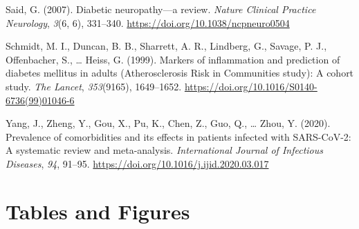 \documentclass[
  man]{apa6}
\newlength{\cslhangindent}
\newlength{\cslentryspacingunit} %
\newenvironment{CSLReferences}[2] %
 {%
  \setlength{\parindent}{0pt}
  \ifodd #1
  \let\oldpar\par
  \def\par{\hangindent=\cslhangindent\oldpar}
  \fi
  \setlength{\parskip}{#2\cslentryspacingunit}
 }%
 {}
\begin{document}
\begin{CSLReferences}{1}{0}
\leavevmode{}%
Said, G. (2007). Diabetic neuropathy---a review. \emph{Nature Clinical Practice Neurology}, \emph{3}(6, 6), 331--340. \url{https://doi.org/10.1038/ncpneuro0504}

\leavevmode{}%
Schmidt, M. I., Duncan, B. B., Sharrett, A. R., Lindberg, G., Savage, P. J., Offenbacher, S., \ldots{} Heiss, G. (1999). Markers of inflammation and prediction of diabetes mellitus in adults ({Atherosclerosis Risk} in {Communities} study): A cohort study. \emph{The Lancet}, \emph{353}(9165), 1649--1652. \url{https://doi.org/10.1016/S0140-6736(99)01046-6}

\leavevmode{}%
Yang, J., Zheng, Y., Gou, X., Pu, K., Chen, Z., Guo, Q., \ldots{} Zhou, Y. (2020). Prevalence of comorbidities and its effects in patients infected with {SARS-CoV-2}: A systematic review and meta-analysis. \emph{International Journal of Infectious Diseases}, \emph{94}, 91--95. \url{https://doi.org/10.1016/j.ijid.2020.03.017}

\end{CSLReferences}

\newpage

\hypertarget{tables-and-figures}{%
\section{Tables and Figures}\label{tables-and-figures}}


\clearpage
\renewcommand{\listfigurename}{Figure captions}

\clearpage
\renewcommand{\listtablename}{Table captions}
\end{document}
